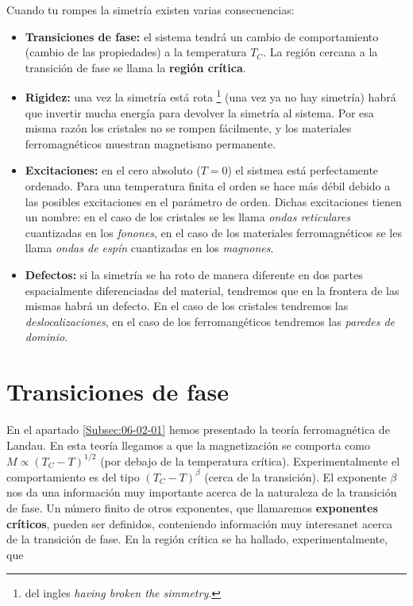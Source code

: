 \documentclass[12pt,a4paper]{book}
\numberwithin{equation}{section}
\numberwithin{figure}{section}
\begin{document}
Cuando tu rompes la simetría existen varias consecuencias: \\

\begin{itemize}
    \item \textbf{Transiciones de fase:} el sistema tendrá un cambio de comportamiento (cambio de las propiedades) a la temperatura $T_C$. La región cercana a la transición de fase se llama la \textbf{región crítica}. \\
    
    \item \textbf{Rigidez:} una vez la simetría está rota \footnote{del ingles \textit{having broken the simmetry}.} (una vez ya no hay simetría) habrá que invertir mucha energía para devolver la simetría al sistema. Por esa misma razón los cristales no se rompen fácilmente, y los materiales ferromagnéticos muestran magnetismo permanente.  \\

    \item \textbf{Excitaciones:} en el cero absoluto ($T=0$) el sistmea está perfectamente ordenado. Para una temperatura finita el orden se hace más débil debido a las posibles excitaciones en el parámetro de orden. Dichas excitaciones tienen un nombre: en el caso de los cristales se les llama \textit{ondas reticulares} cuantizadas en los \textit{fonones}, en el caso de los materiales ferromagnéticos se les llama \textit{ondas de espín} cuantizadas en los \textit{magnones}. \\

    \item \textbf{Defectos:} si la simetría se ha roto de manera diferente en dos partes espacialmente diferenciadas del material, tendremos que en la frontera de las mismas habrá un defecto. En el caso de los cristales tendremos las \textit{deslocalizaciones}, en el caso de los ferromangéticos tendremos las \textit{paredes de dominio}.    
\end{itemize}

\section{Transiciones de fase}

En el apartado \ref{Subsec:06-02-01} hemos presentado la teoría ferromagnética de Landau. En esta teoría llegamos a que la magnetización se comporta como $M\varpropto (T_C-T)^{1/2}$ (por debajo de la temperatura crítica). Experimentalmente el comportamiento es del tipo $(T_C-T)^{\beta}$ (cerca de la transición). El exponente $\beta$ nos da una información muy importante acerca de la naturaleza de la transición de fase. Un número finito de otros exponentes, que llamaremos \textbf{exponentes críticos}, pueden ser definidos, conteniendo información muy interesanet acerca de la transición de fase. En la región crítica se ha hallado, experimentalmente, que
\end{document}
